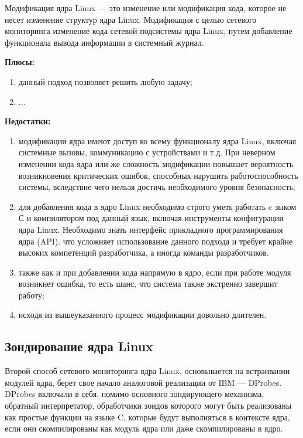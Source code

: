 Модификация ядра Linux --- это изменение или модификация кода, которое не несет изменение структур ядра Linux. Модификация с целью сетевого мониторинга \cite{linux_network_implementation} изменение кода сетевой подсистемы ядра Linux, путем добавление функционала вывода информации в системный журнал.

\textbf{Плюсы:}
\begin{enumerate}
	\item данный подход позволяет решить любую задачу;
	\item ...
\end{enumerate}

\textbf{Недостатки:}
\begin{enumerate}
	\item модификации ядра имеют доступ ко всему функционалу ядра Linux, включая системные вызовы, коммуникацию с устройствами и т.д. При неверном изменении кода ядра или же сложность модификации повышает вероятность возникновения критических ошибок, способных нарушить работоспособность системы, вследствие чего нельзя достичь необходимого уровня безопасность;
	\item для добавления кода в ядро Linux необходимо строго уметь работать c зыком С и компилятором под данный язык, включая инструменты конфигурации ядра Linux. Необходимо знать интерфейс прикладного программирования ядра (API)\cite{api_kernel}. что усложняет использование данного подхода и требует крайне высоких компетенций разработчика, а иногда команды разработчиков.
	\item также как и при добавлении кода напрямую в ядро, если при работе модуля возникнет ошибка, то есть шанс, что система также экстренно завершит
	работу;
	\item исходя из вышеуказанного процесс модификации довольно длителен.
\end{enumerate}

\subsection{Зондирование ядра Linux}
Второй способ сетевого мониторинга ядра Linux, основывается на встраивании модулей ядра, берет свое начало аналоговой реализации от IBM --- DProbes. DProbes включали в себя, помимо основного зондирующего механизма, обратный интерпретатор, обработчики зондов которого могут быть реализованы как простые функции на языке C, которые будут выполняться в контексте ядра, если они скомпилированы как модуль ядра или даже скомпилированы в ядро.

